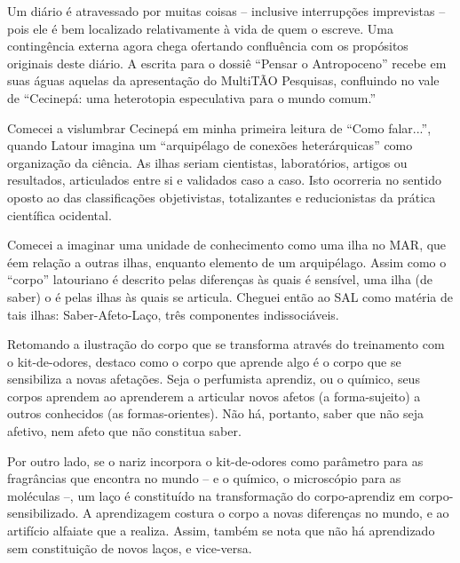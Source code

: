Um diário é atravessado por muitas coisas -- inclusive interrupções imprevistas -- pois ele é bem localizado relativamente à vida de quem o escreve. Uma contingência externa agora chega ofertando confluência com os propósitos originais deste diário. A escrita para o dossiê \enquote{Pensar o Antropoceno} recebe em suas águas aquelas da apresentação do MultiTÃO Pesquisas, confluindo no vale de \enquote{Cecinepá: uma heterotopia especulativa para o mundo comum.}

Comecei a vislumbrar Cecinepá em minha primeira leitura de \enquote{Como falar...}, quando Latour imagina um \enquote{arquipélago de conexões heterárquicas} como organização da ciência. As ilhas seriam cientistas, laboratórios, artigos ou resultados, articulados entre si e validados caso a caso. Isto ocorreria no sentido oposto ao das classificações objetivistas, totalizantes e reducionistas da prática científica ocidental.

Comecei a imaginar uma unidade de conhecimento como uma ilha no MAR, que \guillemetleft é\guillemetright em relação a outras ilhas, enquanto elemento de um arquipélago. Assim como o \enquote{corpo} latouriano é descrito pelas diferenças às quais é sensível, uma ilha (de saber) o é pelas ilhas às quais se articula. Cheguei então ao SAL como matéria de tais ilhas: Saber-Afeto-Laço, três componentes indissociáveis.

Retomando a ilustração do corpo que se transforma através do treinamento com o kit-de-odores, destaco como o corpo que aprende algo é o corpo que se sensibiliza a novas afetações. Seja o perfumista aprendiz, ou o químico, seus corpos aprendem ao aprenderem a articular novos afetos (a forma-sujeito) a outros conhecidos (as formas-orientes). Não há, portanto, saber que não seja afetivo, nem afeto que não constitua saber.

Por outro lado, se o nariz incorpora o kit-de-odores como parâmetro para as fragrâncias que encontra no mundo -- e o químico, o microscópio para as moléculas --, um laço é constituído na transformação do corpo-aprendiz em corpo-sensibilizado. A aprendizagem costura o corpo a novas diferenças no mundo, e ao artifício alfaiate que a realiza. Assim, também se nota que não há aprendizado sem constituição de novos laços, e vice-versa.

